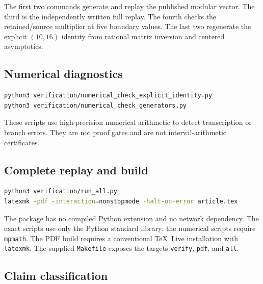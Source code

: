 \documentclass[11pt]{article}
\theoremstyle{definition}
\begin{document}
The first two commands generate and replay the published modular vector.
The third is the independently written full replay.  The fourth checks
the retained/source multiplier at five boundary values.  The last two
regenerate the explicit $(10,16)$ identity from rational matrix
inversion and centered asymptotics.

\subsection{Numerical diagnostics}

\begin{lstlisting}[language=bash]
python3 verification/numerical_check_explicit_identity.py
python3 verification/numerical_check_generators.py
\end{lstlisting}

These scripts use high-precision numerical arithmetic to detect
transcription or branch errors.  They are not proof gates and are not
interval-arithmetic certificates.

\subsection{Complete replay and build}

\begin{lstlisting}[language=bash]
python3 verification/run_all.py
latexmk -pdf -interaction=nonstopmode -halt-on-error article.tex
\end{lstlisting}

The package has no compiled Python extension and no network dependency.
The exact scripts use only the Python standard library; the numerical
scripts require \texttt{mpmath}.  The PDF build requires a conventional
\TeX\ Live installation with \texttt{latexmk}.  The supplied
\texttt{Makefile} exposes the targets \texttt{verify}, \texttt{pdf},
and \texttt{all}.

\subsection{Claim classification}
\end{document}
